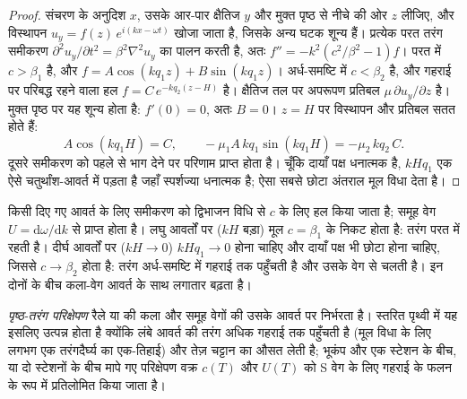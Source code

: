 \begin{proof}
संचरण के अनुदिश $x$, उसके आर-पार क्षैतिज $y$ और मुक्त पृष्ठ से नीचे की ओर $z$ लीजिए,
और विस्थापन
$u_y = f(z)\,e^{i(kx - \omega t)}$ खोजा जाता है, जिसके अन्य घटक शून्य हैं। प्रत्येक परत
तरंग समीकरण $\partial^2 u_y/\partial t^2 = \beta^2\nabla^2 u_y$ का पालन करती है, अतः
$f'' = -k^2\left(c^2/\beta^2 - 1\right) f$। परत में $c > \beta_1$ है, और
$f = A\cos(kq_1z) + B\sin(kq_1z)$। अर्ध-समष्टि में $c < \beta_2$ है, और
गहराई पर परिबद्ध रहने वाला हल $f = C\,e^{-kq_2(z - H)}$ है।
क्षैतिज तल पर अपरूपण प्रतिबल $\mu\,\partial u_y/\partial z$ है।
मुक्त पृष्ठ पर यह शून्य होता है: $f'(0) = 0$, अतः $B = 0$। $z = H$ पर
विस्थापन और प्रतिबल सतत होते हैं:
\[
  A\cos(kq_1H) = C, \qquad -\mu_1 A\,kq_1\sin(kq_1H) = -\mu_2\,kq_2\,C .
\]
दूसरे समीकरण को पहले से भाग देने पर परिणाम प्राप्त होता है। चूँकि
दायाँ पक्ष धनात्मक है, $kHq_1$ एक ऐसे चतुर्थांश-आवर्त में पड़ता है जहाँ
स्पर्शज्या धनात्मक है; ऐसा सबसे छोटा अंतराल मूल विधा देता है।
\end{proof}

किसी दिए गए आवर्त के लिए समीकरण को द्विभाजन विधि से $c$ के लिए हल किया जाता है; समूह
वेग $U = \mathrm d\omega/\mathrm dk$ से प्राप्त होता है। लघु आवर्तों पर
($kH$ बड़ा) मूल $c = \beta_1$ के निकट होता है: तरंग परत में रहती है। दीर्घ आवर्तों पर
($kH \to 0$) $kHq_1 \to 0$ होना चाहिए और दायाँ पक्ष
भी छोटा होना चाहिए, जिससे $c \to \beta_2$ होता है: तरंग अर्ध-समष्टि में
गहराई तक पहुँचती है और उसके वेग से चलती है। इन दोनों के बीच कला-वेग
आवर्त के साथ लगातार बढ़ता है।

\begin{definition}[पृष्ठ-तरंग परिक्षेपण]\label{def:b3:seismology-imaging:dispersion}
\emph{पृष्ठ-तरंग परिक्षेपण} रैले या  की कला और समूह वेगों की
उसके आवर्त पर निर्भरता है। स्तरित पृथ्वी में यह इसलिए उत्पन्न होता है
क्योंकि लंबे आवर्त की तरंग अधिक गहराई तक पहुँचती है
(मूल विधा के लिए लगभग एक तरंगदैर्घ्य का एक-तिहाई) और तेज़ चट्टान का औसत लेती है;
भूकंप और एक स्टेशन के बीच, या दो स्टेशनों के बीच मापे गए परिक्षेपण वक्र $c(T)$ और $U(T)$
को S वेग के लिए गहराई के फलन के रूप में
प्रतिलोमित किया जाता है।
\end{definition}

